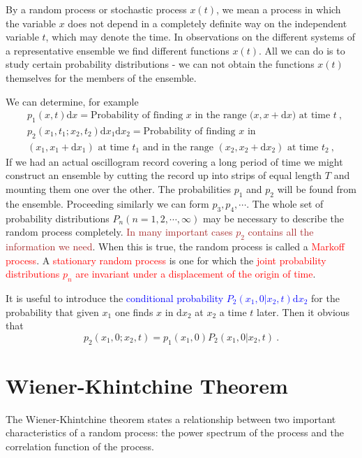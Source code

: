 \documentclass[12pt,a4paper]{article}
\newcommand{\dif}{\mathrm{d}}
\newcounter{theo}[section]\setcounter{theo}{0}
\begin{document}
By a random process or stochastic process $x(t)$, we mean a process in which the variable $x$ does not depend in a completely definite way on the independent variable $t$, which may denote the time. In observations on the different systems of a representative ensemble we find different functions $x(t)$. All we can do is to study certain probability distributions - we can not obtain the functions $x(t)$ themselves for the members of the ensemble. 

We can determine, for example
\begin{align}
& p_1(x, t)\dif x = \text{Probability of finding $x$ in the range $(x, x+\dif x$) at time $t$} ~, \\
\nonumber & p_2(x_1, t_1; x_2, t_2)\dif x_1 \dif x_2 = \text{Probability of finding $x$ in} \\ 
& \text{$(x_1, x_1+\dif x_1)$ at time $t_1$ and in the range $(x_2, x_2+\dif x_2)$ at time $t_2$} ~,
\end{align}
If we had an actual oscillogram record covering a long period of time we might construct an ensemble by cutting the record up into strips of equal length $T$ and mounting them one over the other. The probabilities $p_1$ and $p_2$ will be found from the ensemble. Proceeding similarly we can form $p_3, p_4, \cdots$. The whole set of probability distributions $P_n(n =1, 2, \cdots, \infty)$ may be necessary to describe the random process completely. \textcolor{brown}{In many important cases $p_2$ contains all the information we need}. When this is true, the random process is called a \textcolor{red}{Markoff process}. A \textcolor{red}{stationary random process} is one for which the \textcolor{red}{joint probability distributions $p_n$ are invariant under a displacement of the origin of time}. 

It is useful to introduce the \textcolor{blue}{conditional probability $P_2(x_1, 0|x_2, t) \dif x_2$} for the probability that given $x_1$ one finds $x$ in $\dif x_2$ at $x_2$ a time $t$ later. Then it obvious that
\begin{equation}
p_2(x_1, 0; x_2, t) = p_1(x_1, 0)P_2(x_1, 0|x_2, t) ~.
\end{equation}




\section{Wiener-Khintchine Theorem}
\cite{kittel1958elementary} The Wiener-Khintchine theorem states a relationship between two important characteristics of a random process: the power spectrum of the process and the correlation function of the process. 
\end{document}
